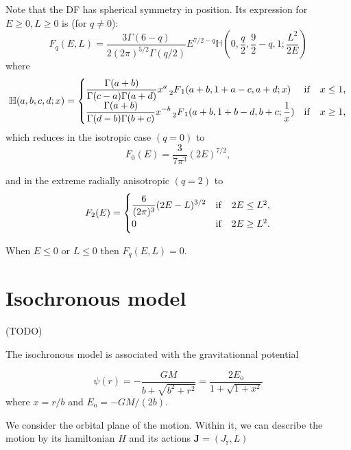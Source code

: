\documentclass[11pt]{article}
\newcommand{\ro}{\mathrm{o}}
\newcommand{\Fq}{F_{q}}
\newcommand{\mH}{\mathbb{H}}
\newcommand{\HG}{\prescript{}{2}F_{1}}
\newcommand{\Jr}{J_{\mathrm{r}}}
\newcommand{\Eo}{E_{\ro}}
\newcommand{\bJ}{\boldsymbol{J}}
\begin{document}
Note that the DF has spherical symmetry in position. Its expression for $E \geq 0, L \geq 0$
is (for $q \neq0$):
\begin{equation}
  \Fq(E,L)=\frac{3\Gamma(6-q)}{2(2\pi)^{5/2}\Gamma(q/2)}E^{7/2-q}\mH(0,\frac{q}{2},\frac{9}{2}-q,1;\frac{L^{2}}{2E})
  \label{eq:def_Fq}
\end{equation}
where
\begin{equation}
\mH(a,b,c,d;x)=\begin{cases}
\displaystyle{\frac{\Gamma(a+b)}{\Gamma(c-a)\Gamma(a+d)}x^{a} \HG(a+b,1+a-c,a+d;x)} & {\rm{if}} \quad x\leq1 ,\\
\displaystyle{\frac{\Gamma(a+b)}{\Gamma(d-b)\Gamma(b+c)}x^{-b} \HG(a+b,1+b-d,b+c;\frac{1}{x})} &{\rm{if}} \quad x\geq1 ,
\end{cases}
\label{eq:def_H}
\end{equation}
which reduces in the isotropic case $(q=0)$ to
\begin{equation}
  F_{0}(E)=\frac{3}{7\pi^{3}}(2E)^{7/2} ,
  \label{eq:F_q=0}
\end{equation}

and in the extreme radially anisotropic $(q=2)$ to
\begin{equation}
  F_{2}(E)=\begin{cases}
\displaystyle{ \frac{6}{(2\pi)^{3}}(2E-L)^{3/2}} & {\rm{if}} \quad 2 E\leq L^{2} ,\\
0 &{\rm{if}} \quad  2 E\geq L^{2} .
\end{cases}
  \label{eq:F_q=2}
\end{equation}

When $E \leq 0$ or $L \leq 0$ then $\Fq(E,L) = 0$.

\section{Isochronous model}
\label{sec:Isochrone}

(TODO)

The isochronous model is associated with the gravitationnal potential

\begin{equation}
  \psi(r) = - \frac{GM}{b+\sqrt{b^{2}+r^{2}}} = \frac{2 \Eo}{1+\sqrt{1+x^{2}}}
  \label{eq:IsoPotential}
\end{equation}
where $x=r/b$ and $\Eo=-GM/(2b)$.

We consider the orbital plane of the motion. Within it, we can describe the motion by its hamiltonian $H$ and its actions $\bJ = (\Jr,L)$
\end{document}
